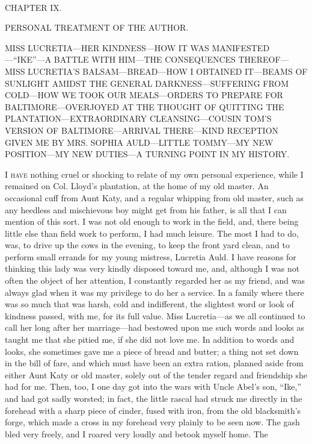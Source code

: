 {}

~

{CHAPTER IX.}

PERSONAL TREATMENT OF THE AUTHOR.

{MISS LUCRETIA---HER KINDNESS---HOW IT WAS MANIFESTED---``IKE''---A
BATTLE WITH HIM---THE CONSEQUENCES THEREOF---MISS LUCRETIA'S
BALSAM---BREAD---HOW I OBTAINED IT---BEAMS OF SUNLIGHT AMIDST THE
GENERAL DARKNESS---SUFFERING FROM COLD---HOW WE TOOK OUR MEALS---ORDERS
TO PREPARE FOR BALTIMORE---OVERJOYED AT THE THOUGHT OF QUITTING THE
PLANTATION---EXTRAORDINARY CLEANSING---COUSIN TOM'S VERSION OF
BALTIMORE---ARRIVAL THERE---KIND RECEPTION GIVEN ME BY MRS. SOPHIA
AULD---LITTLE TOMMY---MY NEW POSITION---MY NEW DUTIES---A TURNING POINT
IN MY HISTORY.}

\textsc{I have} nothing cruel or shocking to relate of my own personal
experience, while I remained on Col. Lloyd's plantation, at the home of
my old master. An occasional cuff from Aunt Katy, and a regular whipping
from old master, such as any heedless and mischievous boy might get from
his father, is all that I can mention of this sort. I was not old enough
to work in the field, and, there being little else than field work to
perform, I had much leisure. The most I had to do, was, to drive up the
cows in the evening, to keep the front yard clean, and to perform small
errands for my young mistress, Lucretia Auld. I have reasons for
thinking this lady was very kindly disposed toward me, and, although I
was not often the object of her attention, I constantly regarded her as
my friend, and was always glad when it was my privilege to do her a
service. In a family where there {}was so much that was harsh, cold and
indifferent, the slightest word or look of kindness passed, with me, for
its full value. Miss Lucretia---as we all continued to call her long
after her marriage---had bestowed upon me such words and looks as taught
me that she pitied me, if she did not love me. In addition to words and
looks, she sometimes gave me a piece of bread and butter; a thing not
set down in the bill of fare, and which must have been an extra ration,
planned aside from either Aunt Katy or old master, solely out of the
tender regard and friendship she had for me. Then, too, I one day got
into the wars with Uncle Abel's son, ``Ike,'' and had got sadly worsted;
in fact, the little rascal had struck me directly in the forehead with a
sharp piece of cinder, fused with iron, from the old blacksmith's forge,
which made a cross in my forehead very plainly to be seen now. The gash
bled very freely, and I roared very loudly and betook myself home. The
